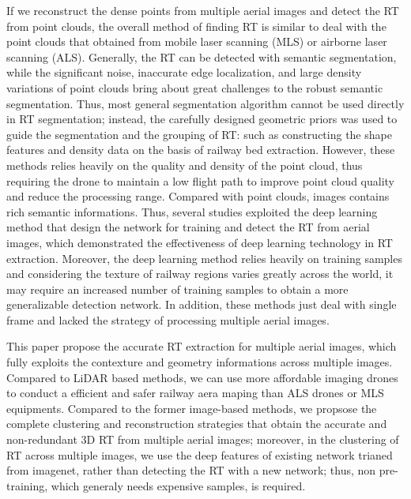 If we reconstruct the dense points from multiple aerial images and detect the RT from point clouds,
the overall method of finding RT is similar to deal with the point clouds that obtained from mobile laser scanning (MLS) or airborne laser scanning (ALS).
Generally,
the RT can be detected with semantic segmentation,
while the significant noise, inaccurate edge localization, and large density variations of point clouds bring about great challenges to the robust semantic segmentation.
Thus,
most general segmentation algorithm cannot be used directly in RT segmentation;
instead,
the carefully designed geometric priors was used to guide the segmentation and the grouping of RT:
such as constructing the shape features and density data on the basis of railway bed extraction.
However,
these methods relies heavily on the quality and density of the point cloud,
thus requiring the drone to maintain a low flight path to improve point cloud quality and reduce the processing range.
Compared with point clouds,
images contains rich semantic informations.
Thus,
several studies exploited the deep learning method that design the network for training and detect the RT from aerial images,
which demonstrated the effectiveness of deep learning technology in RT extraction. 
Moreover,
the deep learning method relies heavily on training samples and considering the texture of railway regions varies greatly across the world,
it may require an increased number of training samples to obtain a more generalizable detection network.
In addition, 
these methods just deal with single frame and lacked the strategy of processing multiple aerial images.

This paper propose the accurate RT extraction for multiple aerial images,
which fully exploits the contexture and geometry informations across multiple images.
Compared to LiDAR based methods,
we can use more affordable imaging drones to conduct a efficient and safer railway aera maping than ALS drones or MLS equipments. 
Compared to the former image-based methods,
we propsose the complete clustering and reconstruction strategies that obtain the accurate and non-redundant 3D RT from multiple aerial images;
moreover, 
in the clustering of RT across multiple images,
we use the deep features of existing network trianed from imagenet, 
rather than detecting the RT with a new network;
thus, 
non pre-training, which generaly needs expensive samples, is required.


























